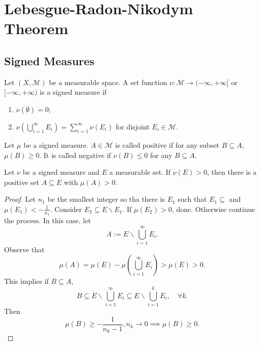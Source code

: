\documentclass[class=book, crop=false]{standalone}
\begin{document}
    \section{Lebesgue-Radon-Nikodym Theorem}
        \subsection{Signed Measures}
        \begin{definition}
            Let $(X, \mathscr{M})$ be a measurable space. A set function $\nu : \mathscr{M} \rightarrow (-\infty, +\infty]$ or $[-\infty, +\infty)$ is a signed measure if
            \begin{enumerate}
                \item $\nu(\emptyset) = 0$;
                \item $\nu\left(\bigcup^{\infty}_{i = 1} E_i\right) = \sum^{\infty}_{i = 1} \nu(E_i)$ for disjoint $E_i \in \mathscr{M}$.
            \end{enumerate}
        \end{definition}
        
        \begin{definition}
            Let $\mu$ be a signed measure. $A \in \mathscr{M}$ is called positive if for any subset $B \subseteq A$, $\mu(B) \geq 0$. It is called negative if $\nu(B) \leq 0$ for any $B \subseteq A$. 
        \end{definition}

        \begin{theorem}
            Let $\nu$ be a signed measure and $E$ a measurable set. If $\nu(E) > 0$, then there is a positive set $A \subseteq E$ with $\mu(A) > 0$.
        \end{theorem}
        \begin{proof}
            Let $n_1$ be the smallest integer so tha there is $E_1$ such that $E_1 \subseteq$ and $\mu(E_1) < -\frac{1}{n_1}$. Consider $E_2 \subseteq E \backslash E_1$. If $\mu(E_2) > 0$, done. Otherwise continue the process. In this case, let
            \begin{equation*}
                A := E \backslash \bigcup^{\infty}_{i = 1} E_i.
            \end{equation*}
            Observe that
            \begin{equation*}
                \mu(A) = \mu(E) - \mu\left(\bigcup^{\infty}_{i = 1} E_i\right) > \mu(E) > 0.
            \end{equation*}
            This implies if $B \subseteq A$,
            \begin{equation*}
                B \subseteq E \backslash \bigcup^{\infty}_{i = 1} E_i \subseteq E \backslash \bigcup^{k}_{i = 1} E_i, \quad \forall k.
            \end{equation*}
            Then
            \begin{equation*}
                \mu(B) \geq -\frac{1}{n_k - 1}, n_k \rightarrow 0 \implies \mu(B) \geq 0.
            \end{equation*}
        \end{proof}
\end{document}
